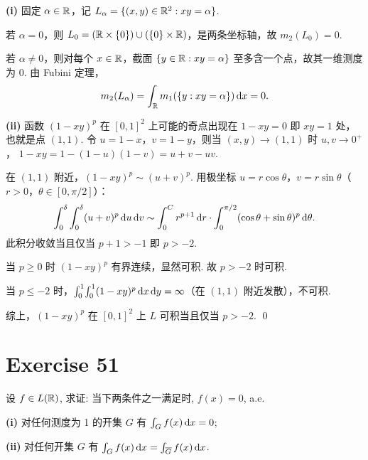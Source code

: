 \documentclass{article}
\begin{document}
\begin{solution}
  \textbf{(i)}\quad
  固定 $\alpha \in \mathbb{R}$，记 $L_\alpha = \{(x,y) \in \mathbb{R}^2 : xy = \alpha\}$.

  若 $\alpha = 0$，则 $L_0 = (\mathbb{R} \times \{0\}) \cup (\{0\} \times \mathbb{R})$，是两条坐标轴，故 $m_2(L_0)=0$.

  若 $\alpha \ne 0$，则对每个 $x \in \mathbb{R}$，截面 $\{y \in \mathbb{R} : xy=\alpha\}$ 至多含一个点，故其一维测度为 $0$.
  由 Fubini 定理，
  \[
    m_2(L_\alpha)
    = \int_{\mathbb{R}} m_1(\{y : xy=\alpha\})\,\mathrm{d} x
    = 0.
  \]

  \textbf{(ii)}\quad
  函数 $(1-xy)^p$ 在 $[0,1]^2$ 上可能的奇点出现在 $1 - xy = 0$ 即 $xy = 1$ 处，
  也就是点 $(1,1)$. 令 $u = 1 - x$，$v = 1 - y$，则当 $(x,y) \to (1,1)$ 时 $u, v \to 0^+$，
  $1 - xy = 1 - (1-u)(1-v) = u + v - uv$.

  在 $(1,1)$ 附近，$(1-xy)^p \sim (u+v)^p$.
  用极坐标 $u = r\cos\theta$，$v = r\sin\theta$（$r > 0$，$\theta \in [0, \pi/2]$）：
  \[
    \int_0^\delta \int_0^\delta (u+v)^p\,\mathrm{d} u\,\mathrm{d} v \sim \int_0^{C} r^{p+1}\,\mathrm{d} r \cdot \int_0^{\pi/2} (\cos\theta + \sin\theta)^p\,\mathrm{d}\theta.
  \]
  此积分收敛当且仅当 $p + 1 > -1$ 即 $p > -2$.

  当 $p \ge 0$ 时 $(1-xy)^p$ 有界连续，显然可积. 故 $p > -2$ 时可积.

  当 $p \le -2$ 时，$\int_0^1\!\int_0^1 (1-xy)^p\,\mathrm{d} x\,\mathrm{d} y = \infty$（在 $(1,1)$ 附近发散），不可积.

  综上，$(1-xy)^p$ 在 $[0,1]^2$ 上 $L$ 可积当且仅当 $p > -2$. \qed
\end{solution}

\section{Exercise 51}

设 $f \in L(\mathbb{R})$, 求证: 当下两条件之一满足时, $f(x) = 0$, a.e.

\textbf{(i)} 对任何测度为 1 的开集 $G$ 有 $\int_G f(x)\,\mathrm{d} x = 0$;

\textbf{(ii)} 对任何开集 $G$ 有 $\int_G f(x)\,\mathrm{d} x = \int_{\overline{G}} f(x)\,\mathrm{d} x$.
\end{document}
